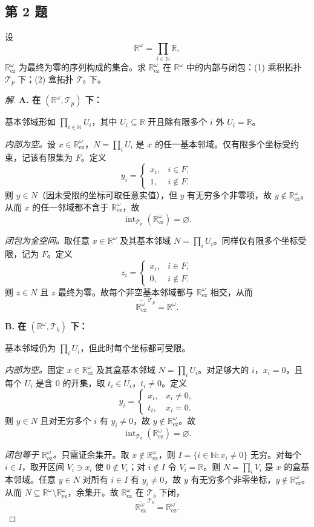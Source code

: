 \documentclass[11pt,a4paper]{article}
\newcommand{\R}{\mathbb{R}}
\newcommand{\N}{\mathbb{N}}
\DeclareMathOperator{\interior}{int}
\theoremstyle{definition}
\newenvironment{solution}{\begin{proof}[解]}{\end{proof}}
\begin{document}
\subsection{第 2 题}

设
\[
  \R^\omega = \prod_{i \in \N} \R,
\]
$\R^\omega_{\mathrm{ez}}$ 为最终为零的序列构成的集合。求 $\R^\omega_{\mathrm{ez}}$ 在 $\R^\omega$ 中的内部与闭包：(1) 乘积拓扑 $\mathcal{T}_p$ 下；(2) 盒拓扑 $\mathcal{T}_b$ 下。

\begin{solution}
\textbf{A. 在 $(\R^\omega, \mathcal{T}_p)$ 下：}

基本邻域形如 $\prod_{i \in \N} U_i$，其中 $U_i \subseteq \R$ 开且除有限多个 $i$ 外 $U_i = \R$。

\emph{内部为空。}设 $x \in \R^\omega_{\mathrm{ez}}$，$N = \prod_i U_i$ 是 $x$ 的任一基本邻域。仅有限多个坐标受约束，记该有限集为 $F$。定义
\[
  y_i = \begin{cases} x_i, & i \in F, \\ 1, & i \notin F. \end{cases}
\]
则 $y \in N$（因未受限的坐标可取任意实值），但 $y$ 有无穷多个非零项，故 $y \notin \R^\omega_{\mathrm{ez}}$。从而 $x$ 的任一邻域都不含于 $\R^\omega_{\mathrm{ez}}$，故
\[
  \interior_{\mathcal{T}_p}(\R^\omega_{\mathrm{ez}}) = \varnothing.
\]

\emph{闭包为全空间。}取任意 $x \in \R^\omega$ 及其基本邻域 $N = \prod_i U_i$。同样仅有限多个坐标受限，记为 $F$。定义
\[
  z_i = \begin{cases} x_i, & i \in F, \\ 0, & i \notin F. \end{cases}
\]
则 $z \in N$ 且 $z$ 最终为零。故每个非空基本邻域都与 $\R^\omega_{\mathrm{ez}}$ 相交，从而
\[
  \overline{\R^\omega_{\mathrm{ez}}}^{\,\mathcal{T}_p} = \R^\omega.
\]

\textbf{B. 在 $(\R^\omega, \mathcal{T}_b)$ 下：}

基本邻域仍为 $\prod_i U_i$，但此时每个坐标都可受限。

\emph{内部为空。}固定 $x \in \R^\omega_{\mathrm{ez}}$ 及其盒基本邻域 $N = \prod_i U_i$。对足够大的 $i$，$x_i = 0$，且每个 $U_i$ 是含 $0$ 的开集，取 $t_i \in U_i$，$t_i \ne 0$。定义
\[
  y_i = \begin{cases} x_i, & x_i \ne 0, \\ t_i, & x_i = 0. \end{cases}
\]
则 $y \in N$ 且对无穷多个 $i$ 有 $y_i \ne 0$，故 $y \notin \R^\omega_{\mathrm{ez}}$。故
\[
  \interior_{\mathcal{T}_b}(\R^\omega_{\mathrm{ez}}) = \varnothing.
\]

\emph{闭包等于 $\R^\omega_{\mathrm{ez}}$。}只需证余集开。取 $x \notin \R^\omega_{\mathrm{ez}}$，则 $I = \{i \in \N : x_i \ne 0\}$ 无穷。对每个 $i \in I$，取开区间 $V_i \ni x_i$ 使 $0 \notin V_i$；对 $i \notin I$ 令 $V_i = \R$。则 $N = \prod_i V_i$ 是 $x$ 的盒基本邻域。任意 $y \in N$ 对所有 $i \in I$ 有 $y_i \ne 0$，故 $y$ 有无穷多个非零坐标，$y \notin \R^\omega_{\mathrm{ez}}$。从而 $N \subseteq \R^\omega \setminus \R^\omega_{\mathrm{ez}}$，余集开。故 $\R^\omega_{\mathrm{ez}}$ 在 $\mathcal{T}_b$ 下闭，
\[
  \overline{\R^\omega_{\mathrm{ez}}}^{\,\mathcal{T}_b} = \R^\omega_{\mathrm{ez}}.
\]
\end{solution}
\end{document}
